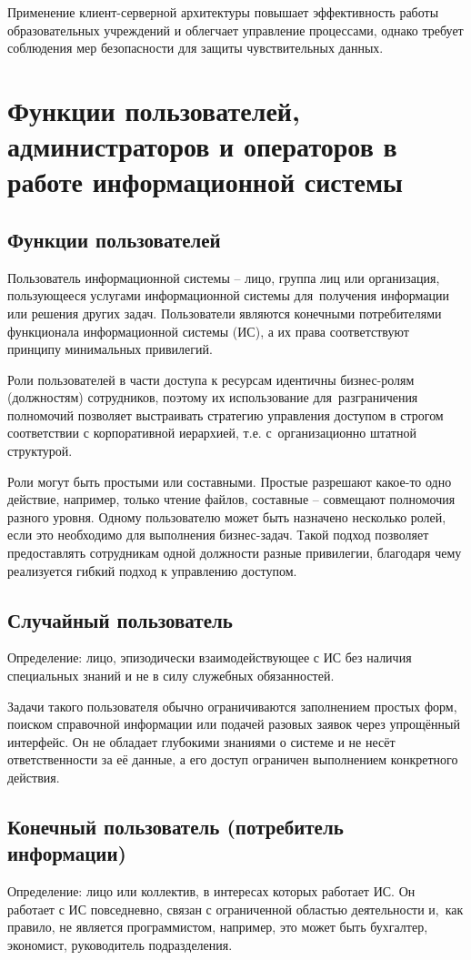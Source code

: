 \documentclass{ou}
\begin{document}
Применение клиент-серверной архитектуры повышает эффективность работы
образовательных учреждений и облегчает управление процессами, однако
требует соблюдения мер безопасности для защиты чувствительных данных.
\newpage
\section{Функции пользователей, администраторов и операторов в работе информационной системы}
\subsection{Функции пользователей}
Пользователь информационной системы -- лицо, группа лиц или организация, пользующееся услугами информационной системы для~получения информации или решения других задач. Пользователи являются конечными потребителями функционала информационной системы (ИС), а их права соответствуют принципу минимальных привилегий\cite{skyeng_user}.

Роли пользователей в части доступа к ресурсам идентичны бизнес-ролям (должностям) сотрудников, поэтому их использование для~разграничения полномочий позволяет выстраивать стратегию управления доступом в строгом соответствии с корпоративной иерархией, т.е. с~организационно штатной структурой.

Роли могут быть простыми или составными. Простые разрешают какое-то одно действие, например, только чтение файлов, составные -- совмещают полномочия разного уровня. Одному пользователю может быть назначено несколько ролей, если это необходимо для выполнения бизнес-задач. Такой подход позволяет предоставлять сотрудникам одной должности разные привилегии, благодаря чему реализуется гибкий подход к управлению доступом\cite{studfile_user}.
\subsection{Случайный пользователь}
Определение: лицо, эпизодически взаимодействующее с ИС без наличия специальных знаний и не в силу служебных обязанностей.

Задачи такого пользователя обычно ограничиваются заполнением простых форм, поиском справочной информации или подачей разовых заявок через упрощённый интерфейс. Он не обладает глубокими знаниями о системе и не несёт ответственности за её данные, а его доступ ограничен выполнением конкретного действия\cite{nag_it}.
\subsection{Конечный пользователь (потребитель информации)}
Определение: лицо или коллектив, в интересах которых работает ИС. Он работает с ИС повседневно, связан с ограниченной областью деятельности и,~как правило, не является программистом, например, это может быть бухгалтер, экономист, руководитель подразделения.
\end{document}

